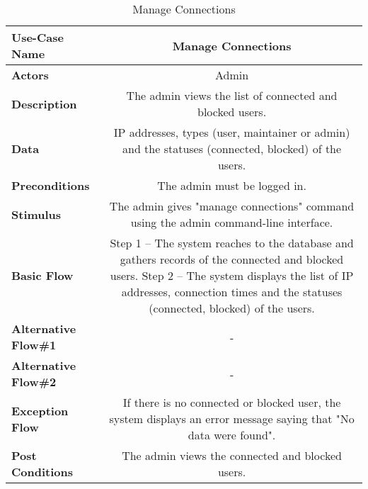 \begin{table}[H]
     \centering
     \begin{tabular}{|l|C|}
         \hline
          \textbf{Use-Case Name} & Manage Connections \\
         \hline
          \textbf{Actors} & Admin \\ 
         \hline
          \textbf{Description} & The admin views the list of connected and blocked users. \\ 
         \hline
          \textbf{Data} & IP addresses, types (user, maintainer or admin) and the statuses (connected, blocked) of the users. \\
         \hline
          \textbf{Preconditions} & 
          The admin must be logged in. \\
         \hline
          \textbf{Stimulus} & The admin gives "manage connections" command using the admin command-line interface.\\ 
         \hline
          \textbf{Basic Flow} & 
          Step 1 -- The system reaches to the database and gathers records of the connected and blocked users. \newline
          Step 2 -- The system displays the list of IP addresses, connection times and the statuses (connected, blocked) of the users. \\
         \hline
          \textbf{Alternative Flow\#1} & -\\
         \hline
          \textbf{Alternative Flow\#2} & - \\
         \hline
          \textbf{Exception Flow} & If there is no connected or blocked user, the system displays an error message saying that "No data were found".\\
         \hline
          \textbf{Post Conditions} & The admin views the connected and blocked users. \\ 
         \hline
     \end{tabular}
     \caption{Manage Connections}
     \label{tab:manage_connections}
 \end{table}